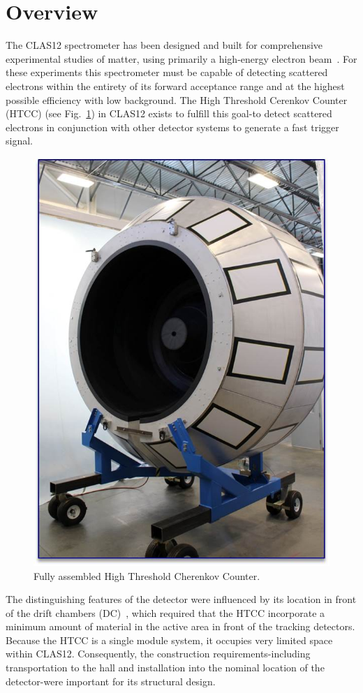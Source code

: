 \section{Overview}

The CLAS12 spectrometer has been designed and built for comprehensive experimental studies of matter,
using primarily a high-energy electron beam~\cite{clas12-nim}. For these experiments this spectrometer
must be capable of detecting scattered electrons within the entirety of its forward acceptance range
and at the highest possible efficiency with low background. The High Threshold Cerenkov Counter (HTCC) (see
Fig.~\ref{fig:Picture1}) in CLAS12 exists to fulfill this goal-to detect scattered electrons in conjunction with
other detector systems to generate a fast trigger signal. 

\begin{figure}[ht]
    \centering
    \includegraphics[width=0.75\linewidth]{images/Picture1.jpg}
    \caption{Fully assembled High Threshold Cherenkov Counter.}
    \label{fig:Picture1}
\end{figure}
The distinguishing features of the detector were influenced by its location in front of the drift chambers
(DC)~\cite{dc-nim}, which required that the HTCC incorporate a minimum amount of material in the active
area in front of the tracking detectors. Because the HTCC is a single module system, it occupies very limited
space within CLAS12. Consequently, the construction requirements-including transportation to the hall and
installation into the nominal location of the detector-were important for its structural design. 
